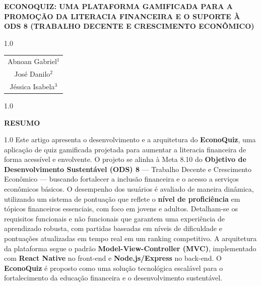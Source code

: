 \documentclass[a4paper, 12pt]{article}
\begin{document}
\thispagestyle{empty}

\begin{center}
\vspace*{3cm}

\Large\textbf{\uppercase{EconoQuiz: Uma Plataforma Gamificada para a Promoção da Literacia Financeira e o Suporte à ODS 8 (Trabalho Decente e Crescimento Econômico)}}
\par
\vspace{2cm}

\normalsize
\begin{spacing}{1.0}
\begin{tabular}{c}
Abnoan Gabriel$^{1}$\\
José Danilo$^{2}$\\
Jéssica Isabela$^{3}$
\end{tabular}
\end{spacing}
\end{center}

\begin{spacing}{1.0}
\end{spacing}

\newpage
\thispagestyle{plain}

\begin{center}
\normalfont\normalsize\textbf{RESUMO}
\end{center}

\begin{spacing}{1.0}
\noindent Este artigo apresenta o desenvolvimento e a arquitetura do \textbf{EconoQuiz}, uma aplicação de quiz gamificada projetada para aumentar a literacia financeira de forma acessível e envolvente. O projeto se alinha à Meta 8.10 do \textbf{Objetivo de Desenvolvimento Sustentável (ODS) 8} — Trabalho Decente e Crescimento Econômico — buscando fortalecer a inclusão financeira e o acesso a serviços econômicos básicos. O desempenho dos usuários é avaliado de maneira dinâmica, utilizando um sistema de pontuação que reflete o \textbf{nível de proficiência} em tópicos financeiros essenciais, com foco em jovens e adultos. Detalham-se os requisitos funcionais e não funcionais que garantem uma experiência de aprendizado robusta, com partidas baseadas em níveis de dificuldade e pontuações atualizadas em tempo real em um ranking competitivo. A arquitetura da plataforma segue o padrão \textbf{Model-View-Controller (MVC)}, implementado com \textbf{React Native} no front-end e \textbf{Node.js/Express} no back-end. O \textbf{EconoQuiz} é proposto como uma solução tecnológica escalável para o fortalecimento da educação financeira e o desenvolvimento sustentável.
\end{spacing}
\end{document}
